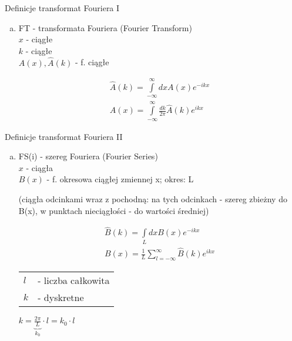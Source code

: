 \begin{frame}{Definicje transformat Fouriera I}
	\begin{enumerate}[a)]
		\item FT - transformata Fouriera (Fourier Transform) \\
		$x$ - ciągłe \\
		$k$ - ciągłe \\
		$A(x), \widehat{A}(k)$ - f. ciągłe
		\begin{block}
		\centering
		\renewcommand{\arraystretch}{1.5}
		\setlength{\abovedisplayskip}{0pt}
		\setlength{\belowdisplayskip}{0pt}
		\setlength{\abovedisplayshortskip}{0pt}
		\setlength{\belowdisplayshortskip}{0pt}
		\[
			\begin{array}{c}
			\widehat{A}(k) = \int\limits_{-\infty}^{\infty}dx A(x) e^{-ikx} \\
			A(x) = \int\limits_{-\infty}^{\infty} \frac{dk}{2 \pi} \widehat{A}(k) e^{ikx}
			\end{array}
			\tag{16.1}
		\]
		\end{block}
	\end{enumerate}
\end{frame}
\begin{frame}{Definicje transformat Fouriera II}
	\begin{enumerate}[b)]
		\item FS(i) - szereg Fouriera (Fourier Series) \\
		$x$ - ciągła \\
		$B(x)$ - f. okresowa ciągłej zmiennej x; okres: L
		\begin{center}
			(ciągła odcinkami wraz z pochodną: na tych odcinkach - szereg zbieżny do B(x), w punktach nieciągłości - do wartości średniej)
		\end{center}
		\begin{block}
		\centering
		\renewcommand{\arraystretch}{1.5}
		\setlength{\abovedisplayskip}{0pt}
		\setlength{\belowdisplayskip}{0pt}
		\setlength{\abovedisplayshortskip}{0pt}
		\setlength{\belowdisplayshortskip}{0pt}
		\[
			\begin{array}{c}
			\widehat{B}(k) = \int\limits_{L}dx B(x) e^{-ikx} \\
			B(x) = \frac{1}{L}\sum\limits_{l = -\infty}^{\infty} \widehat{B}(k) e^{ikx}
			\end{array}
			\tag{16.2}
		\]
		\end{block}
		\begin{tabular}{ll}
			$l$ & - liczba całkowita \\
			$k$ & - dyskretne
		\end{tabular}
		\hfill $k = \underbrace{\frac{2 \pi}{L}}_{k_0} \cdot l = k_0 \cdot l$
	\end{enumerate}
\end{frame}
